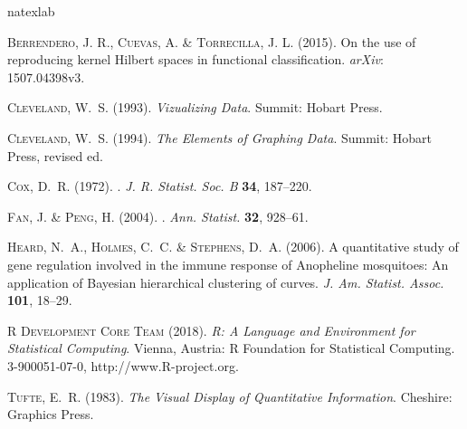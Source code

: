 \documentclass[article,lineno]{biometrika}
\begin{document}
%
%

\begin{thebibliography}{7}
\expandafter\ifx\csname natexlab\endcsname\relax\def\natexlab#1{#1}\fi

\textsc{Berrendero, J. R., Cuevas, A. \& Torrecilla, J. L.} (2015).
\newblock On the use of reproducing kernel Hilbert spaces in functional
  classification.
\newblock \textit{arXiv}: 1507.04398v3.


\textsc{Cleveland, W.~S.} (1993).
\newblock \textit{{Vizualizing Data}}.
\newblock Summit: Hobart Press.

\textsc{Cleveland, W.~S.} (1994).
\newblock \textit{{The Elements of Graphing Data}}.
\newblock Summit: Hobart Press, revised ed.

\textsc{Cox, D.~R.} (1972).
.
\newblock \textit{J. R. Statist. Soc. {\rm B}} \textbf{34}, 187--220.

\textsc{Fan, J.} \& \textsc{Peng, H.} (2004).
.
\newblock \textit{Ann. Statist.} \textbf{32}, 928--61.

\textsc{Heard, N.~A.}, \textsc{Holmes, C.~C.} \& \textsc{Stephens, D.~A.}
  (2006).
\newblock A quantitative study of gene regulation involved in the immune
  response of {A}nopheline mosquitoes: {A}n application of {B}ayesian
  hierarchical clustering of curves.
\newblock \textit{J. Am. Statist. Assoc.} \textbf{101}, 18--29.

\textsc{{R Development Core Team}} (2018).
\newblock \textit{R: A Language and Environment for Statistical Computing}.
\newblock Vienna, Austria: R Foundation for Statistical Computing.
 3-900051-07-0, http://www.R-project.org.

\textsc{Tufte, E.~R.} (1983).
\newblock \textit{{The Visual Display of Quantitative Information}}.
\newblock Cheshire: Graphics Press.

\end{thebibliography}
\end{document}
